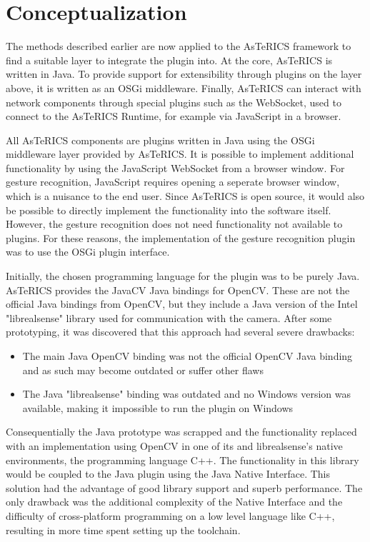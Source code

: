 \documentclass[BSA,Bachelor,english]{twbook}%
\begin{document}
\section{Conceptualization}

The methods described earlier are now applied to the AsTeRICS framework to find a suitable layer to integrate the plugin into. At the core, AsTeRICS is written in Java. To provide support for extensibility through plugins on the layer above, it is written as an OSGi middleware. Finally, AsTeRICS can interact with network components through special plugins such as the WebSocket, used to connect to the AsTeRICS Runtime, for example via JavaScript in a browser.

All AsTeRICS components are plugins written in Java using the OSGi middleware layer provided by AsTeRICS. It is possible to implement additional functionality by using the JavaScript WebSocket from a browser window. For gesture recognition, JavaScript requires opening a seperate browser window, which is a nuisance to the end user. Since AsTeRICS is open source, it would also be possible to directly implement the functionality into the software itself. However, the gesture recognition does not need functionality not available to plugins. For these reasons, the implementation of the gesture recognition plugin was to use the OSGi plugin interface.

Initially, the chosen programming language for the plugin was to be purely Java. AsTeRICS provides the JavaCV Java bindings for OpenCV\cite{JCV}. These are not the official Java bindings from OpenCV, but they include a Java version of the Intel "librealsense" library used for communication with the camera. After some prototyping, it was discovered that this approach had several severe drawbacks:

\begin{itemize}
	\item The main Java OpenCV binding was not the official OpenCV Java binding and as such may become outdated or suffer other flaws
	\item The Java "librealsense" binding was outdated and no Windows version was available, making it impossible to run the plugin on Windows
\end{itemize}

Consequentially the Java prototype was scrapped and the functionality replaced with an implementation using OpenCV in one of its and librealsense's native environments, the programming language C++. The functionality in this library would be coupled to the Java plugin using the Java Native Interface. This solution had the advantage of good library support and superb performance. The only drawback was the additional complexity of the Native Interface and the difficulty of cross-platform programming on a low level language like C++, resulting in more time spent setting up the toolchain.
\newpage
\end{document}
